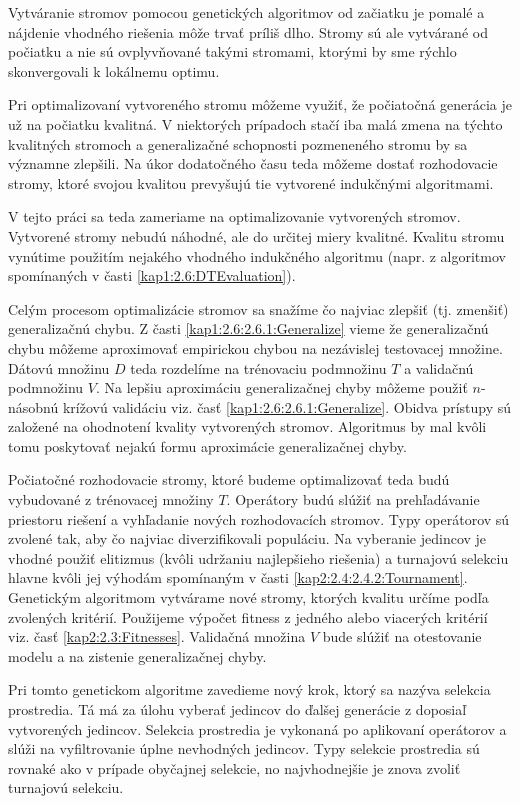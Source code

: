 Vytváranie stromov pomocou genetických algoritmov od začiatku je pomalé a nájdenie vhodného riešenia môže trvať príliš dlho. Stromy sú ale vytvárané od počiatku a nie sú ovplyvňované takými stromami, ktorými by sme rýchlo skonvergovali k lokálnemu optimu. 

Pri optimalizovaní vytvoreného stromu môžeme využiť, že počiatočná generácia je už na počiatku kvalitná. V niektorých prípadoch stačí iba malá zmena na týchto kvalitných stromoch a generalizačné schopnosti pozmeneného stromu by sa významne zlepšili. Na úkor dodatočného času teda môžeme dostať rozhodovacie stromy, ktoré svojou kvalitou prevyšujú tie vytvorené indukčnými algoritmami.

V tejto práci sa teda zameriame na optimalizovanie vytvorených stromov. Vytvorené stromy nebudú náhodné, ale do určitej miery kvalitné. Kvalitu stromu vynútime použitím nejakého vhodného indukčného algoritmu (napr. z algoritmov spomínaných v časti \ref{kap1:2.6:DTEvaluation}).

Celým procesom optimalizácie stromov sa snažíme čo najviac zlepšiť (tj. zmenšiť) generalizačnú chybu. Z časti \ref{kap1:2.6:2.6.1:Generalize} vieme že generalizačnú chybu môžeme aproximovať empirickou chybou na nezávislej testovacej množine. Dátovú množinu $D$ teda rozdelíme na trénovaciu podmnožinu $T$ a validačnú podmnožinu $V$. Na lepšiu aproximáciu generalizačnej chyby môžeme použiť $n$-násobnú krížovú validáciu viz. časť \ref{kap1:2.6:2.6.1:Generalize}. Obidva prístupy sú založené na ohodnotení kvality vytvorených stromov. Algoritmus by mal kvôli tomu poskytovať nejakú formu aproximácie generalizačnej chyby.

Počiatočné rozhodovacie stromy, ktoré budeme optimalizovať teda budú vybudované z trénovacej množiny $T$. Operátory budú slúžiť na prehľadávanie priestoru riešení a vyhľadanie nových rozhodovacích stromov. Typy operátorov sú zvolené tak, aby čo najviac diverzifikovali populáciu. Na vyberanie jedincov je vhodné použiť elitizmus (kvôli udržaniu najlepšieho riešenia) a turnajovú selekciu hlavne kvôli jej výhodám spomínaným v časti \ref{kap2:2.4:2.4.2:Tournament}. Genetickým algoritmom vytvárame nové stromy, ktorých kvalitu určíme podľa zvolených kritérií. Použijeme výpočet fitness z jedného alebo viacerých kritérií viz. časť \ref{kap2:2.3:Fitnesses}. Validačná množina $V$ bude slúžiť na otestovanie modelu a na zistenie generalizačnej chyby.

Pri tomto genetickom algoritme zavedieme nový krok, ktorý sa nazýva selekcia prostredia. Tá má za úlohu vyberať jedincov do ďalšej generácie z doposiaľ vytvorených jedincov. Selekcia prostredia je vykonaná po aplikovaní operátorov a slúži na vyfiltrovanie úplne nevhodných jedincov. Typy selekcie prostredia sú rovnaké ako v prípade obyčajnej selekcie, no najvhodnejšie je znova zvoliť turnajovú selekciu.

